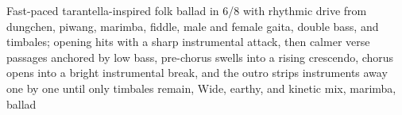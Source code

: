 

\begin{notes}
\end{notes}

\begin{style}
Fast-paced tarantella-inspired folk ballad in 6/8 with rhythmic drive from dungchen, piwang, marimba, fiddle, male and female gaita, double bass, and timbales; opening hits with a sharp instrumental attack, then calmer verse passages anchored by low bass, pre-chorus swells into a rising crescendo, chorus opens into a bright instrumental break, and the outro strips instruments away one by one until only timbales remain, Wide, earthy, and kinetic mix, marimba, ballad
\end{style}

